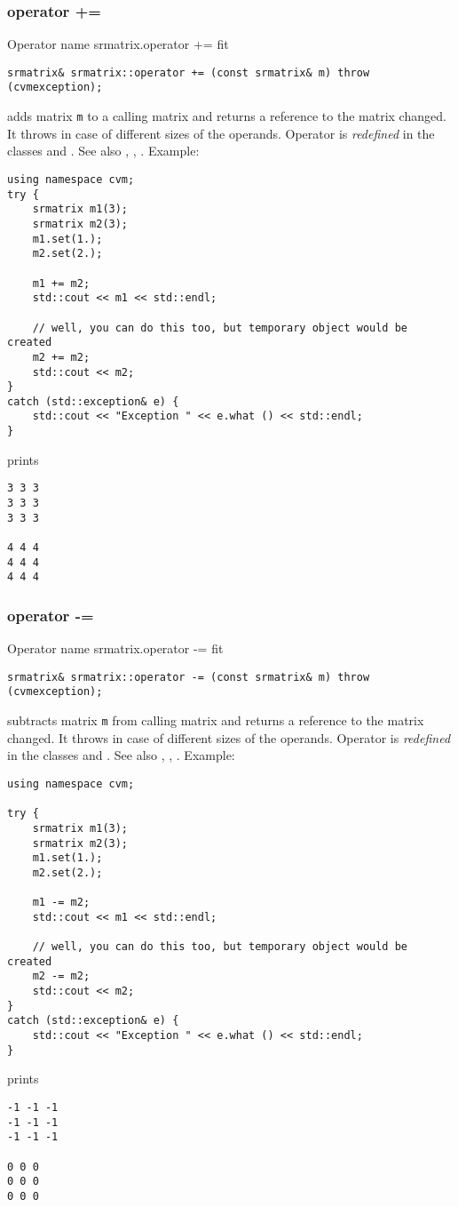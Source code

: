 \subsubsection{operator +=}
Operator%
\pdfdest name {srmatrix.operator +=} fit
\begin{verbatim}
srmatrix& srmatrix::operator += (const srmatrix& m) throw (cvmexception);
\end{verbatim}
adds  matrix \verb"m" to a calling matrix 
and returns a reference to
the matrix changed.
It throws  
in case of different sizes of the operands.
Operator is \emph{redefined} in the classes
and .
See also ,
,
.
Example:
\begin{Verbatim}
using namespace cvm;
try {
    srmatrix m1(3);
    srmatrix m2(3);
    m1.set(1.);
    m2.set(2.);

    m1 += m2;
    std::cout << m1 << std::endl;

    // well, you can do this too, but temporary object would be created
    m2 += m2; 
    std::cout << m2;
}
catch (std::exception& e) {
    std::cout << "Exception " << e.what () << std::endl;
}
\end{Verbatim}
prints
\begin{Verbatim}
3 3 3
3 3 3
3 3 3

4 4 4
4 4 4
4 4 4
\end{Verbatim}
\newpage




\subsubsection{operator -=}
Operator%
\pdfdest name {srmatrix.operator -=} fit
\begin{verbatim}
srmatrix& srmatrix::operator -= (const srmatrix& m) throw (cvmexception);
\end{verbatim}
subtracts  matrix \verb"m" from  calling matrix
and returns a reference to
the matrix changed.
It throws  
in case of different sizes of the operands.
Operator is \emph{redefined} in the classes
and .
See also ,
,
.
Example:
\begin{Verbatim}
using namespace cvm;

try {
    srmatrix m1(3);
    srmatrix m2(3);
    m1.set(1.);
    m2.set(2.);

    m1 -= m2;
    std::cout << m1 << std::endl;

    // well, you can do this too, but temporary object would be created
    m2 -= m2; 
    std::cout << m2;
}
catch (std::exception& e) {
    std::cout << "Exception " << e.what () << std::endl;
}
\end{Verbatim}
prints
\begin{Verbatim}
-1 -1 -1
-1 -1 -1
-1 -1 -1

0 0 0
0 0 0
0 0 0
\end{Verbatim}
\newpage



